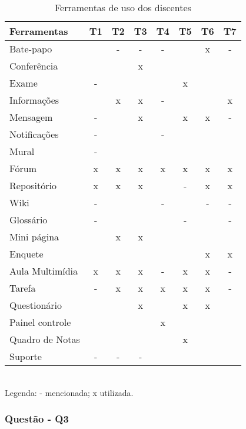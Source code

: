 \begin{table}[ht!]
\footnotesize
\caption{Ferramentas de uso dos discentes}
\label{tab:Q2}
\centering
\begin{tabular}{|l|c|c|c|c|c|c|c|}
\addlinespace \hline
    \bigstrut \textbf{Ferramentas}&{T1}&{T2}&{T3}&{T4}&{T5}&{T6}&{T7}\\
\hline
    \bigstrut[t]
    Bate-papo	    & 	& - & - & - &   & x & - \\ \hline
    Conferência	    &   &   & x &   &   &   &   \\ \hline	    
    Exame 		    & - &   &   &   & x &   &   \\ \hline	
    Informações	    & 	& x & x & - &   &   & x \\ \hline
    Mensagem	    & -	&   & x &   & x & x & - \\ \hline
    Notificações    & -	&   &   & - &   &   &   \\ \hline    
    Mural		    & -	&   &   &   &   &   &   \\ \hline
    Fórum		    & x	& x & x & x & x & x & x \\ \hline
    Repositório	    & x	& x & x &   & - & x & x \\ \hline
    Wiki		    & -	&   &   & - &   & - & - \\ \hline
    Glossário	    & -	&   &   &   & - &   & - \\ \hline
    Mini página	    &	& x & x &   &   &   &   \\ \hline
    Enquete		    &  	&   &   &   &   & x & x \\ \hline    
    Aula Multimídia & x	& x & x & - & x & x & - \\ \hline
    Tarefa		    & -	& x & x & x & x & x & - \\ \hline
    Questionário    &  	&   & x &   & x & x &   \\ \hline
    Painel controle&  	&   &   & x &   &   &   \\ \hline 
    Quadro de Notas &  	&   &   &   & x &   &   \\ \hline    
    \bigstrut[b]
    Suporte	    	& -	& - & - &   &   &   &  \\ 
\hline
\end{tabular}
\\Legenda: - mencionada; x utilizada.
\end{table}

\subsubsection{Questão - Q3}%


